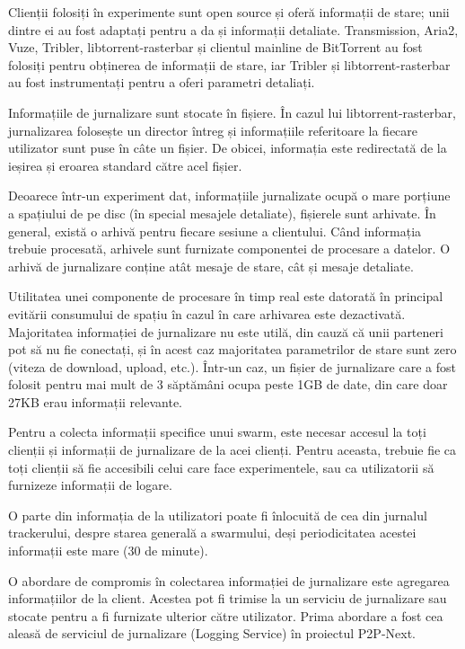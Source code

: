 Clienții folosiți în experimente sunt open source și oferă informații de
stare; unii dintre ei au fost adaptați pentru a da și informații detaliate.
Transmission, Aria2, Vuze, Tribler, libtorrent-rasterbar și clientul mainline
de BitTorrent au fost folosiți pentru obținerea de informații de stare, iar
Tribler și libtorrent-rasterbar au fost instrumentați pentru a oferi
parametri detaliați.

Informațiile de jurnalizare sunt stocate în fișiere. În cazul lui
libtorrent-rasterbar, jurnalizarea folosește un director întreg și
informațiile referitoare la fiecare utilizator sunt puse în câte un fișier.
De obicei, informația este redirectată de la ieșirea și eroarea standard
către acel fișier.

Deoarece într-un experiment dat, informațiile jurnalizate ocupă o mare porțiune
a spațiului de pe disc (în special mesajele detaliate), fișierele sunt
arhivate. În general, există o arhivă pentru fiecare sesiune a clientului. Când
informația trebuie procesată, arhivele sunt furnizate componentei de procesare
a datelor. O arhivă de jurnalizare conține atât mesaje de stare, cât și
mesaje detaliate.

Utilitatea unei componente de procesare în timp real este datorată în
principal evitării consumului de spațiu în cazul în care arhivarea este
dezactivată. Majoritatea informației de jurnalizare nu este utilă, din cauză
că unii parteneri pot să nu fie conectați, și în acest caz majoritatea
parametrilor de stare sunt zero (viteza de download, upload, etc.). Într-un caz,
un fișier de jurnalizare care a fost folosit pentru mai mult de 3 săptămâni
ocupa peste 1GB de date, din care doar 27KB erau informații relevante.

Pentru a colecta informații specifice unui swarm, este necesar accesul la
toți clienții și informații de jurnalizare de la acei clienți. Pentru aceasta,
trebuie fie ca toți clienții să fie accesibili celui care face experimentele,
sau ca utilizatorii să furnizeze informații de logare.

O parte din informația de la utilizatori poate fi înlocuită de cea din jurnalul
trackerului, despre starea generală a swarmului, deși periodicitatea acestei informații este mare (30 de minute).

O abordare de compromis în colectarea informației de jurnalizare este agregarea
informațiilor de la client. Acestea pot fi trimise la un serviciu de
jurnalizare sau stocate pentru a fi furnizate ulterior către utilizator.
Prima abordare a fost cea aleasă de serviciul de jurnalizare (Logging Service)
în proiectul P2P-Next.

